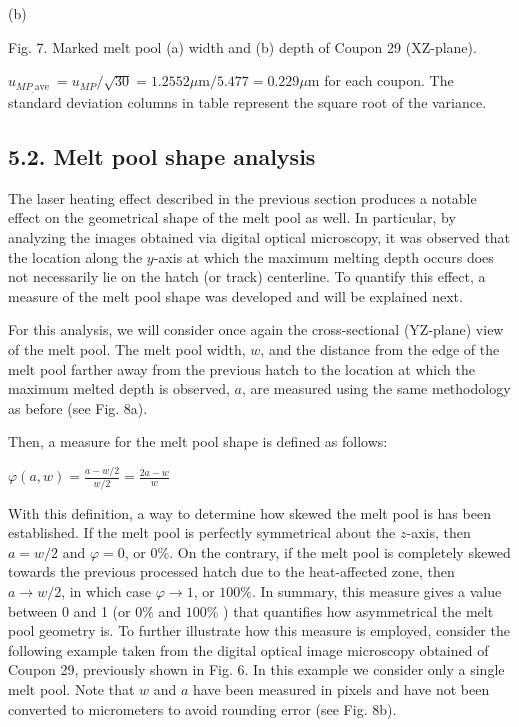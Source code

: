 \documentclass[10pt]{article}
\begin{document}
(b)

Fig. 7. Marked melt pool (a) width and (b) depth of Coupon 29 (XZ-plane).

$u_{M P_{\_} \text {ave }}=u_{M P} / \sqrt{30}=1.2552 \mu \mathrm{m} / 5.477=0.229 \mu \mathrm{m}$ for each coupon. The standard deviation columns in table represent the square root of the variance.

\subsection*{5.2. Melt pool shape analysis}
The laser heating effect described in the previous section produces a notable effect on the geometrical shape of the melt pool as well. In particular, by analyzing the images obtained via digital optical microscopy, it was observed that the location along the $y$-axis at which the maximum melting depth occurs does not necessarily lie on the hatch (or track) centerline. To quantify this effect, a measure of the melt pool shape was developed and will be explained next.

For this analysis, we will consider once again the cross-sectional (YZ-plane) view of the melt pool. The melt pool width, $w$, and the distance from the edge of the melt pool farther away from the previous hatch to the location at which the maximum melted depth is observed, $a$, are measured using the same methodology as before (see Fig. 8a).

Then, a measure for the melt pool shape is defined as follows:

$\varphi(a, w)=\frac{a-w / 2}{w / 2}=\frac{2 a-w}{w}$

With this definition, a way to determine how skewed the melt pool is has been established. If the melt pool is perfectly symmetrical about the $z$-axis, then $a=w / 2$ and $\varphi=0$, or $0 \%$. On the contrary, if the melt pool is completely skewed towards the previous processed hatch due to the heat-affected zone, then $a \rightarrow w / 2$, in which case $\varphi \rightarrow 1$, or $100 \%$. In summary, this measure gives a value between 0 and 1 (or $0 \%$ and $100 \%$ ) that quantifies how asymmetrical the melt pool geometry is. To further illustrate how this measure is employed, consider the following example taken from the digital optical image microscopy obtained of Coupon 29, previously shown in Fig. 6. In this example we consider only a single melt pool. Note that $w$ and $a$ have been measured in pixels and have not been converted to micrometers to avoid rounding error (see Fig. 8b).
\end{document}
